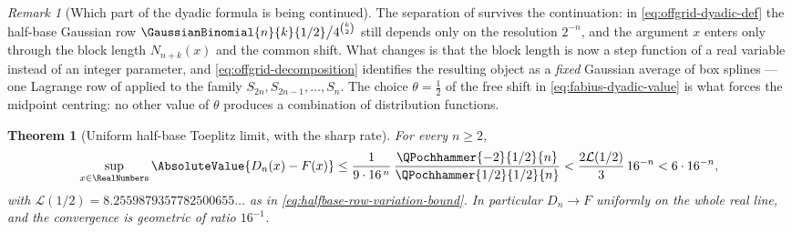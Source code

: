 \documentclass[11pt,a4paper,oneside,openany]{book}
\newtheorem{theorem}{Theorem}[chapter]
\theoremstyle{definition}
\theoremstyle{remark}
\newtheorem{remark}[remark]{Remark}
\begin{document}
\begin{remark}[Which part of the dyadic formula is being continued]\label{rem:offgrid-architecture}
The separation of  survives the
continuation: in \eqref{eq:offgrid-dyadic-def} the half-base Gaussian row
$\GaussianBinomial{n}{k}{1/2}\big/4^{\binom k2}$ still depends only on the resolution
$2^{-n}$, and the argument $x$ enters only through the block length $N_{n+k}(x)$
and the common shift.  What changes is that the block length is now a
step function of a real variable instead of an integer parameter, and
\eqref{eq:offgrid-decomposition} identifies the resulting object as a
\emph{fixed} Gaussian average of box splines --- one Lagrange row of
 applied to the family
$S_{2n},S_{2n-1},\ldots,S_n$.  The choice $\theta=\tfrac12$ of the free shift in
\eqref{eq:fabius-dyadic-value} is what forces the midpoint centring: no other
value of $\theta$ produces a combination of distribution functions.
\end{remark}



\begin{theorem}[Uniform half-base Toeplitz limit, with the sharp rate]\label{thm:offgrid-uniform-rate}
For every $n\ge2$,
\begin{equation}\label{eq:offgrid-uniform-rate}
 \sup_{x\in\RealNumbers}\AbsoluteValue{D_n(x)-F(x)}
 \le\frac1{9\cdot16^{\,n}}\,
   \frac{\QPochhammer{-2}{1/2}{n}}{\QPochhammer{1/2}{1/2}{n}}
 <\frac{2\mathcal L(1/2)}{3}\,16^{-n}
 <6\cdot16^{-n},
\end{equation}
with $\mathcal L(1/2)=8.2559879357782500655\ldots$ as in
\eqref{eq:halfbase-row-variation-bound}.  In particular $D_n\to F$ uniformly on
the whole real line, and the convergence is geometric of ratio $16^{-1}$.
\end{theorem}
\end{document}
